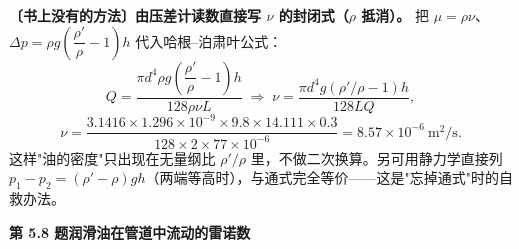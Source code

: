 \begin{banfa}
\textbf{〔书上没有的方法〕由压差计读数直接写 $\nu$ 的封闭式（$\rho$ 抵消）。} 把 $\mu=\rho\nu$、$\Delta p=\rho g\left(\dfrac{\rho'}{\rho}-1\right)h$ 代入哈根--泊肃叶公式：
\[Q=\frac{\pi d^4\rho g\left(\dfrac{\rho'}{\rho}-1\right)h}{128\rho\nu L}
\;\Longrightarrow\;
\nu=\frac{\pi d^4 g\left(\rho'/\rho-1\right)h}{128LQ},\]
\[\nu=\frac{3.1416\times1.296\times10^{-9}\times9.8\times14.111\times0.3}{128\times2\times77\times10^{-6}}=8.57\times10^{-6}\ \mathrm{m^2/s}.\]这样"油的密度"只出现在无量纲比 $\rho'/\rho$ 里，不做二次换算。另可用静力学直接列 $p_1-p_2=(\rho'-\rho)gh$（两端等高时），与通式完全等价——这是"忘掉通式"时的自救办法。
\end{banfa}

\noindent\textbf{第 5.8 题\quad 润滑油在管道中流动的雷诺数}

